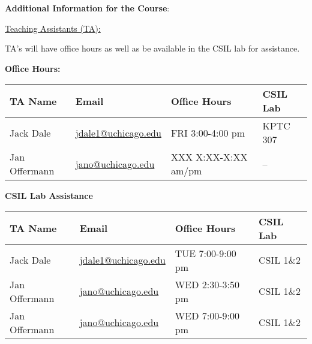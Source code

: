 \noindent \textbf {\Large \sc Additional Information for the Course}:

\vspace{1cm}

\noindent \underline{Teaching Assistants (TA):}

\noindent TA's will have office hours as well as be available in the CSIL lab for assistance.

\textbf{Office Hours:}

\begin{tabular}{l l | l | l }

TA Name & Email & Office Hours & CSIL Lab \\ \hline

Jack Dale          & \href{mailto:jdale1@uchicago.edu}{jdale1@uchicago.edu}  & FRI  3:00-4:00 pm  & KPTC 307 \\
Jan Offermann      & \href{mailto:jano@uchicago.edu}{jano@uchicago.edu}      & XXX  X:XX-X:XX am/pm  & -- \\


\end{tabular}

\vspace{1cm}

\textbf{CSIL Lab Assistance}

\begin{tabular}{l l | l | l }

TA Name & Email & Office Hours & CSIL Lab \\ \hline

Jack Dale          & \href{mailto:jdale1@uchicago.edu}{jdale1@uchicago.edu}  & TUE  7:00-9:00 pm  & CSIL 1\&2 \\
Jan Offermann      & \href{mailto:jano@uchicago.edu}{jano@uchicago.edu}      & WED  2:30-3:50 pm  & CSIL 1\&2 \\
Jan Offermann      & \href{mailto:jano@uchicago.edu}{jano@uchicago.edu}      & WED  7:00-9:00 pm  & CSIL 1\&2 \\


\end{tabular}

\vspace{1cm}

